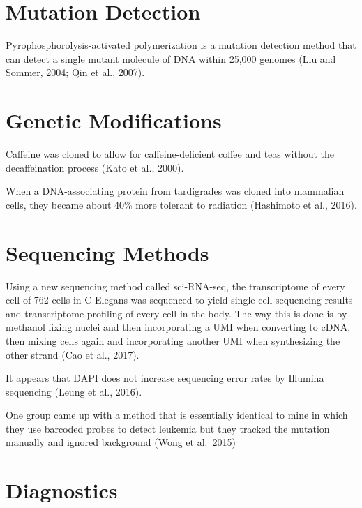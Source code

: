 \documentclass[]{book}
\begin{document}
\hypertarget{mutation-detection}{%
\section{Mutation Detection}\label{mutation-detection}}

Pyrophosphorolysis-activated polymerization is a mutation detection method that can detect a single mutant molecule of DNA within 25,000 genomes (Liu and Sommer, 2004; Qin et al., 2007).

\hypertarget{genetic-modifications}{%
\section{Genetic Modifications}\label{genetic-modifications}}

Caffeine was cloned to allow for caffeine-deficient coffee and teas without the decaffeination process (Kato et al., 2000).

When a DNA-associating protein from tardigrades was cloned into mammalian cells, they became about 40\% more tolerant to radiation (Hashimoto et al., 2016).

\hypertarget{sequencing-methods}{%
\section{Sequencing Methods}\label{sequencing-methods}}

Using a new sequencing method called sci-RNA-seq, the transcriptome of every cell of 762 cells in C Elegans was sequenced to yield single-cell sequencing results and transcriptome profiling of every cell in the body. The way this is done is by methanol fixing nuclei and then incorporating a UMI when converting to cDNA, then mixing cells again and incorporating another UMI when synthesizing the other strand (Cao et al., 2017).

It appears that DAPI does not increase sequencing error rates by Illumina sequencing (Leung et al., 2016).

One group came up with a method that is essentially identical to mine in which they use barcoded probes to detect leukemia but they tracked the mutation manually and ignored background (Wong et al.~2015)

\hypertarget{diagnostics}{%
\section{Diagnostics}\label{diagnostics}}
\end{document}
